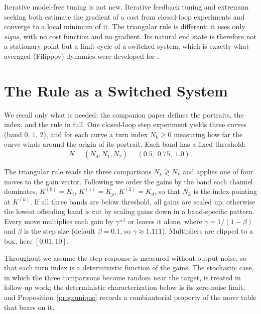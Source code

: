 \documentclass[letterpaper, 10pt, conference, twocolumn]{ieeeconf}
\newcommand{\Nbar}{\bar{N}}
\begin{document}
Iterative model-free tuning is not new. Iterative feedback tuning
\cite{Hjalmarsson1998} and extremum seeking \cite{Killingsworth2006} both
estimate the gradient of a cost from closed-loop experiments and converge to a
local minimum of it. The triangular rule is different: it uses only
\emph{signs}, with no cost function and no gradient. Its natural end state is
therefore not a stationary point but a limit cycle of a switched system, which
is exactly what averaged (Filippov) dynamics were developed for
\cite{Filippov1988}.

\section{The Rule as a Switched System}
\label{sec:rule}

We recall only what is needed; the companion paper \cite{Paper1} defines the
portraits, the index, and the rule in full. One closed-loop step experiment
yields three curves (band $0$, $1$, $2$), and for each curve a turn index
$N_k \ge 0$ measuring how far the curve winds around the origin of its
portrait. Each band has a fixed threshold:
\begin{equation}
\Nbar = (\Nbar_0, \Nbar_1, \Nbar_2) = (0.5,\; 0.75,\; 1.0).
\label{eq:thresholds}
\end{equation}

The triangular rule reads the three comparisons $N_k \gtrless \Nbar_k$ and
applies one of four moves to the gain vector. Following \cite{Paper1} we
order the gains by the band each channel dominates,
$K^{(0)} = K_i$, $K^{(1)} = K_p$, $K^{(2)} = K_d$, so that $N_k$ is the index
pointing at $K^{(k)}$. If all
three bands are below threshold, all gains are scaled up; otherwise the lowest
offending band is cut by scaling gains down in a band-specific pattern. Every
move multiplies each gain by $\gamma^{\pm 1}$ or leaves it alone, where
$\gamma = 1/(1-\beta)$ and $\beta$ is the step size (default $\beta = 0.1$,
so $\gamma \approx 1.111$). Multipliers are clipped to a box, here
$[0.01, 10]$.

Throughout we assume the step response is measured without output noise, so
that each turn index is a deterministic function of the gains. The stochastic
case, in which the three comparisons become random near the target, is treated
in follow-up work; the deterministic characterization below is its zero-noise
limit, and Proposition~\ref{prop:unique} records a combinatorial property of
the move table that bears on it.
\end{document}
